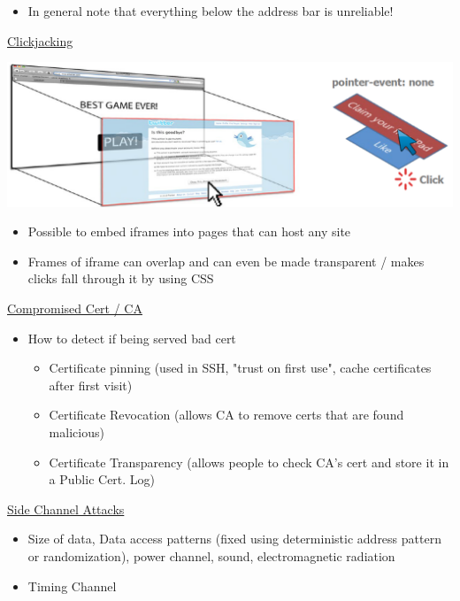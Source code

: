 \documentclass[10pt,landscape,a4paper]{article}
\begin{document}
\begin{multicols*}{4}
\begin{itemize}
	\item In general note that everything below the address bar is unreliable!
\end{itemize}
\underline{Clickjacking}\newline
\begin{minipage}{0.6\columnwidth}
	\begin{center}
		\includegraphics[width=1\columnwidth]{clickjacking}
	\end{center}
\end{minipage}
\begin{minipage}{0.4\columnwidth}
	\begin{itemize}
		\item Possible to embed iframes into pages that can host any site
		\item Frames of iframe can overlap and can even be made transparent / makes clicks fall through it by using CSS
	\end{itemize}
\end{minipage}
\underline{Compromised Cert / CA}
\begin{itemize}
	\item How to detect if being served bad cert
	\begin{itemize}
		\item Certificate pinning (used in SSH, "trust on first use", cache certificates after first visit)
		\item Certificate Revocation (allows CA to remove certs that are found malicious)
		\item Certificate Transparency (allows people to check CA's cert and store it in a Public Cert. Log)
	\end{itemize}
\end{itemize}
\underline{Side Channel Attacks}
\begin{itemize}
	\item Size of data, Data access patterns (fixed using deterministic address pattern or randomization), power channel, sound, electromagnetic radiation
	\item Timing Channel
	\begin{itemize}

\end{itemize}
\end{itemize}
\end{multicols*}
\end{document}
